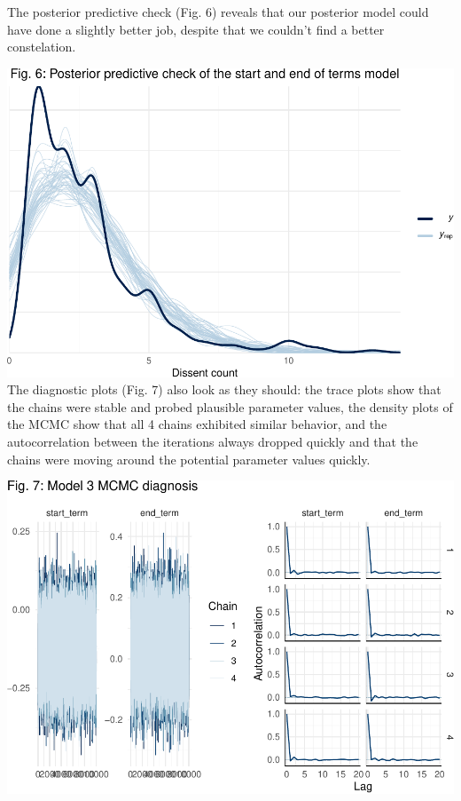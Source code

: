 \documentclass[
  11pt,
]{article}
\begin{document}
The posterior predictive check (Fig. 6) reveals that our posterior model
could have done a slightly better job, despite that we couldn't find a
better constelation.

\vspace{25pt}

\includegraphics{dissents_article_appendix_files/figure-latex/posterior_check_term-1.pdf}
\vspace{25pt} The diagnostic plots (Fig. 7) also look as they should:
the trace plots show that the chains were stable and probed plausible
parameter values, the density plots of the MCMC show that all 4 chains
exhibited similar behavior, and the autocorrelation between the
iterations always dropped quickly and that the chains were moving around
the potential parameter values quickly.

\vspace{25pt}

\includegraphics{dissents_article_appendix_files/figure-latex/mcmc_diagnosis_term-1.pdf}
\vspace{25pt}
\end{document}
